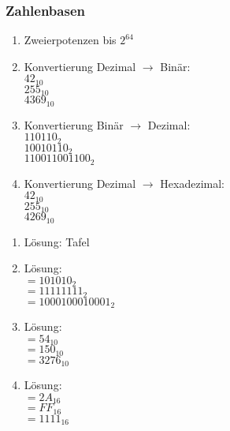 \begin{frame}
    \frametitle{Zahlenbasen}
    \vspace{0.5cm}

    \begin{multicols}{2}
        \begin{enumerate}
            \item Zweierpotenzen bis \( 2^{64} \) 
            \item Konvertierung Dezimal \( \rightarrow \) Binär: \\
                \( 42_{10} \) \\
                \( 255_{10} \) \\
                \( 4369_{10} \)
            \item Konvertierung Binär \( \rightarrow \) Dezimal: \\
                \( 110110_{2} \) \\
                \( 10010110_{2} \) \\
                \( 110011001100_{2} \) \\
            \item Konvertierung Dezimal \( \rightarrow \) Hexadezimal: \\
                \( 42_{10} \) \\
                \( 255_{10} \) \\
                \( 4269_{10} \) \\
        \end{enumerate}
        \vfill\columnbreak
        \pause

        \begin{enumerate}
            \item Lösung: Tafel
            \item Lösung: \\
                \( = 101010_{2} \) \\
                \( = 11111111_{2} \) \\
                \( = 1000100010001_{2} \)
            \item Lösung: \\
                \( = 54_{10} \) \\
                \( = 150_{10} \) \\
                \( = 3276_{10} \) \\
            \item Lösung: \\
                \( = 2A_{16} \) \\
                \( = FF_{16} \) \\
                \( = 1111_{16} \) \\
        \end{enumerate}
    \end{multicols}
\end{frame}

